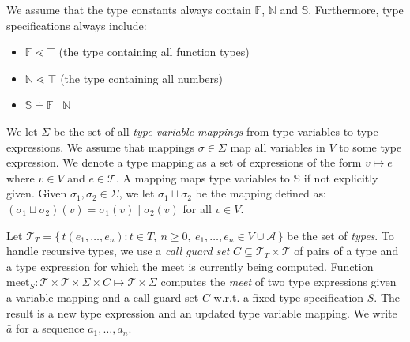 \documentclass[a4paper]{amsart}
\begin{document}
We assume that the type constants always contain $\mathbb{F}$, $\mathbb{N}$ and $\mathbb{S}$.
Furthermore, type specifications always include:
\begin{itemize}
	\item $\mathbb{F} \lessdot \top$ (the type containing all function types)
	\item $\mathbb{N} \lessdot \top$ (the type containing all numbers)
	\item $\mathbb{S} \doteq \mathbb{F} \mid \mathbb{N}$
\end{itemize}

We let $\Sigma$ be the set of all \emph{type variable mappings} from type variables to type expressions.
We assume that mappings $\sigma\in\Sigma$ map all variables in $V$ to some type expression.
We denote a type mapping as a set of expressions of the form $v \mapsto e$ where $v \in V$ and $e \in \mathcal{T}$.
A mapping maps type variables to $\mathbb{S}$ if not explicitly given.
Given $\sigma_1, \sigma_2 \in \Sigma$, we let $\sigma_1 \sqcup \sigma_2$ be the mapping defined as:
$(\sigma_1 \sqcup \sigma_2)(v) = \sigma_1(v) \mid \sigma_2(v)$ for all $v \in V$.

Let $\mathcal{T}_T = \{\, t(e_1,\dots,e_n) : t \in T,\ n \ge 0,\ e_1,\dots,e_n \in V \cup \mathcal{A} \,\}$
be the set of \emph{types}.
To handle recursive types,
we use a \emph{call guard set} $C \subseteq \mathcal{T}_T \times \mathcal{T}$ of pairs of a type and a type expression
for which the meet is currently being computed.
Function $\mathrm{meet}_{S}: \mathcal{T} \times \mathcal{T} \times \Sigma \times C \mapsto \mathcal{T} \times \Sigma$
computes the \emph{meet} of two type expressions given a variable mapping and a call guard set $C$ w.r.t. a fixed type specification $S$.
The result is a new type expression and an updated type variable mapping.
We write $\bar a$ for a sequence $a_1,\dots,a_n$.
\end{document}
